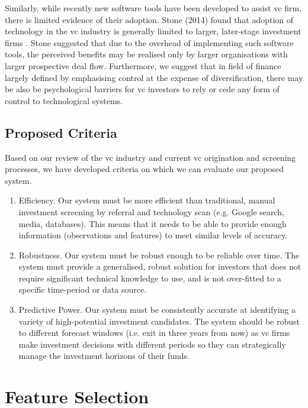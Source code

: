 \documentclass[../thesis/thesis.tex]{subfiles}
\begin{document}
Similarly, while recently new software tools have been developed to assist \gls{vc} firm, there is limited evidence of their adoption. Stone (2014) found that adoption of technology in the \gls{vc} industry is generally limited to larger, later-stage investment firms \cite{stone2014}. Stone suggested that due to the overhead of implementing such software tools, the perceived benefits may be realised only by larger organisations with larger prospective deal flow. Furthermore, we suggest that in field of finance largely defined by emphasising control at the expense of diversification, there may be also be psychological barriers for \gls{vc} investors to rely or cede any form of control to technological systems.

\subsection{Proposed Criteria}

Based on our review of the \gls{vc} industry and current \gls{vc} origination and screening processes, we have developed criteria on which we can evaluate our proposed system.

\begin{enumerate}

\item Efficiency. Our system must be more efficient than traditional, manual investment screening by referral and technology scan (e.g. Google search, media, databases). This means that it needs to be able to provide enough information (observations and features) to meet similar levels of accuracy.

\item Robustness. Our system must be robust enough to be reliable over time. The system must provide a generalised, robust solution for investors that does not require significant technical knowledge to use, and is not over-fitted to a specific time-period or data source.

\item Predictive Power. Our system must be consistently accurate at identifying a variety of high-potential investment candidates. The system should be robust to different forecast windows (i.e. exit in three years from now) as \gls{vc} firms make investment decisions with different periods so they can strategically manage the investment horizons of their funds.

\end{enumerate}

\section{Feature Selection}
\end{document}
